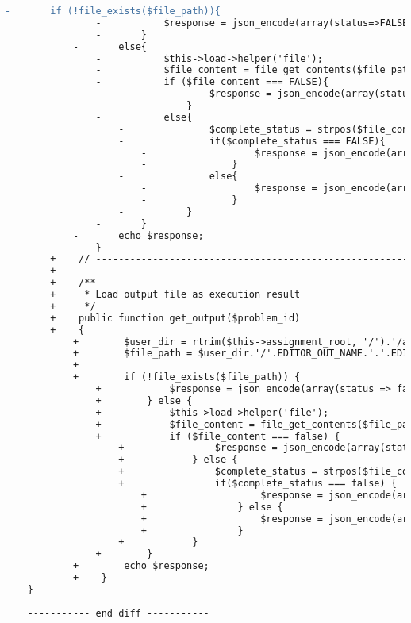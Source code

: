 \begin{lstlisting}[language=diff, caption=Perubahan pada kode Submit.php]
			-		if (!file_exists($file_path)){
				-			$response = json_encode(array(status=>FALSE, content=>''));
				-		}
			-		else{
				-			$this->load->helper('file');
				-			$file_content = file_get_contents($file_path);
				-			if ($file_content === FALSE){
					-				$response = json_encode(array(status=>FALSE, content=>''));
					-			}
				-			else{
					-				$complete_status = strpos($file_content, 'Total Execution Time');
					-				if($complete_status === FALSE){
						-					$response = json_encode(array(status=>FALSE, content=>$file_content));
						-				}
					-				else{
						-					$response = json_encode(array(status=>TRUE, content=>$file_content));
						-				}
					-			}
				-		}
			-		echo $response;
			-	}
		+    // ------------------------------------------------------------------------
		+
		+    /**
		+     * Load output file as execution result
		+     */
		+    public function get_output($problem_id)
		+    {
			+        $user_dir = rtrim($this->assignment_root, '/').'/assignment_'.$this->user->selected_assignment['id'].'/p'.$problem_id.'/'.$this->user->username;
			+        $file_path = $user_dir.'/'.EDITOR_OUT_NAME.'.'.EDITOR_FILE_EXT;
			+
			+        if (!file_exists($file_path)) {
				+            $response = json_encode(array(status => false, content => ''));
				+        } else {
				+            $this->load->helper('file');
				+            $file_content = file_get_contents($file_path);
				+            if ($file_content === false) {
					+                $response = json_encode(array(status => false, content => ''));
					+            } else {
					+                $complete_status = strpos($file_content, 'Total Execution Time');
					+                if($complete_status === false) {
						+                    $response = json_encode(array(status => false, content => $file_content));
						+                } else {
						+                    $response = json_encode(array(status => true, content => $file_content));
						+                }
					+            }
				+        }
			+        echo $response;
			+    }
	}
	
	----------- end diff -----------
\end{lstlisting}


